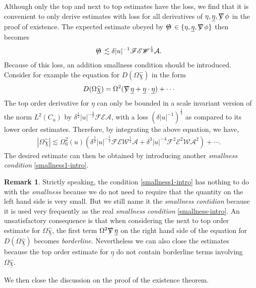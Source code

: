 \documentclass[11pt,reqno]{amsart}
\theoremstyle{definition}
\newtheorem{remark}{Remark}[section]
\numberwithin{equation}{section}
\def\chibh{\widehat{\underline{\chi}}}
\def\etab{\underline{\eta}}
\def\nablas{\mbox{$\nabla \mkern -13mu /$ }}
\def\Thetas{\mbox{$\Theta \mkern -12mu /$ }}
\begin{document}
Although only the top and next to top estimates have the loss, we find that it is convenient to only derive estimates with loss for all derivatives of $\eta,\etab,\nablas\phi$ in the proof of existence. The expected estimate obeyed by $\Thetas\in\{\eta,\etab,\nablas\phi\}$ then becomes
\begin{align*}
\Thetas\lesssim\delta|u|^{-1}\mathscr{F}\mathscr{E}\mathscr{W}^{\frac{1}{2}}\mathcal{A}.
\end{align*}
Because of this loss, an addition smallness condition should be introduced. Consider for example the equation for $D(\Omega\chibh)$ in the form
\begin{align*}
D(\Omega\chibh)=\Omega^2(\nablas\etab+\etab\cdot\etab)+\cdots
\end{align*}
The top order derivative for $\etab$ can only be bounded in a scale invariant version of the norm $L^2(C_u)$ by $\delta^{\frac{1}{2}}|u|^{-\frac{3}{2}}\mathscr{F}\mathscr{E}\mathcal{A}$, with a loss $(\delta|u|^{-1})^{\frac{1}{2}}$ as compared to its lower order estimates. Therefore, by integrating the above equation, we have,
\begin{align*}
|\Omega\chibh|\lesssim\Omega_0^2(u)(\delta^{\frac{3}{2}}|u|^{-\frac{5}{2}}\mathscr{F}\mathscr{E}\mathscr{W}^{\frac{1}{2}}\mathcal{A}+\delta^3|u|^{-4}\mathscr{F}^2\mathscr{E}^2\mathscr{W}\mathcal{A}^2)+\cdots.
\end{align*}
The desired estimate can then be obtained by introducing another \emph{smallness condition} \eqref{smallness1-intro}.
\begin{remark}
Strictly speaking, the condition \eqref{smallness1-intro} has nothing to do with the \emph{smallness} because we do not need to require that the quantity on the left hand side is very small. But we still name it the \emph{smallness contidion} because it is used very frequently as the real \emph{smallness condition} \eqref{smallness-intro}.
An unsatisfactory consequence is that when considering the next to top order estimate for $\Omega\chibh$, the first term $\Omega^2\nablas\etab$ on the right hand side of the equation for $D(\Omega\chibh)$ becomes \emph{borderline}. Nevertheless we can also close the estimates because the top order estimate for $\etab$ do not contain borderline terms involving $\Omega\chibh$. \end{remark}

We then close the discussion on the proof of the existence theorem.
\end{document}
